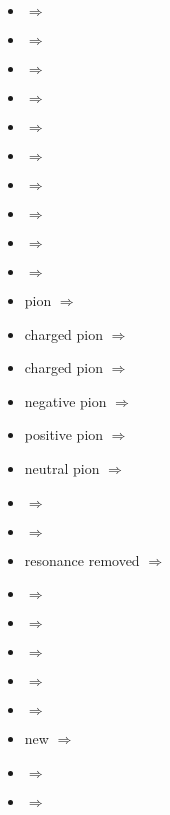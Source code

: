 \begin{multicols}{2}
{\begin{itemize}
\item  {} $\Rightarrow$ \Pcgh
\item  {} $\Rightarrow$ \Pgha
\item  {} $\Rightarrow$ \Pghb
\item  {} $\Rightarrow$ \Pghpri
\item  {} $\Rightarrow$ \Pcghi
\item  {} $\Rightarrow$ \Pgo
\item  {} $\Rightarrow$ \Pgoi
\item  {} $\Rightarrow$ \Pgoa
\item  {} $\Rightarrow$ \Pgob
\item  {} $\Rightarrow$ \Pgoiii
\item pion\newline {} $\Rightarrow$ \Pgp
\item charged pion\newline {} $\Rightarrow$ \Pgppm
\item charged pion\newline {} $\Rightarrow$ \Pgpmp
\item negative pion\newline {} $\Rightarrow$ \Pgpm
\item positive pion\newline {} $\Rightarrow$ \Pgpp
\item neutral pion\newline {} $\Rightarrow$ \Pgpz
\item  {} $\Rightarrow$ \Pgpa
\item  {} $\Rightarrow$ \Pgpii
\item resonance removed\newline {} $\Rightarrow$ \Pgr
\item  {} $\Rightarrow$ \Pgrp
\item  {} $\Rightarrow$ \Pgrm
\item  {} $\Rightarrow$ \Pgrpm
\item  {} $\Rightarrow$ \Pgrmp
\item  {} $\Rightarrow$ \Pgrz
\item new\newline {} $\Rightarrow$ \Pgri
\item  {} $\Rightarrow$ \Pgra
\item  {} $\Rightarrow$ \Pgrb

\end{itemize}}
\end{multicols}
